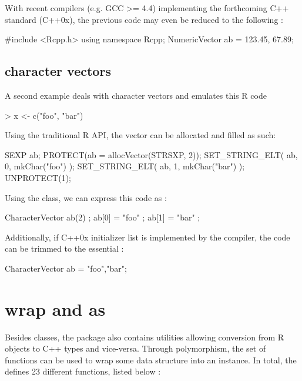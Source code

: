 With recent compilers (e.g. GCC >= 4.4) implementing the forthcoming 
C++ standard (C++0x), the previous code may even be reduced 
to the following :

\begin{example}
#include <Rcpp.h>
using namespace Rcpp;
NumericVector ab = {123.45, 67.89};
\end{example}

\subsection{character vectors}

A second example deals with character vectors and emulates this R code

\begin{example}
> x <- c("foo", "bar")
\end{example}

Using the traditional R API, the vector can be allocated and filled as such:

\begin{example}
SEXP ab;
PROTECT(ab = allocVector(STRSXP, 2));
SET_STRING_ELT( ab, 0, mkChar("foo") );
SET_STRING_ELT( ab, 1, mkChar("bar") );
UNPROTECT(1);
\end{example}

Using the  class, we can express this code as : 

\begin{example}
CharacterVector ab(2) ;
ab[0] = "foo" ;
ab[1] = "bar" ;
\end{example}

Additionally, if C++0x initializer list is implemented by the compiler, the 
code can be trimmed to the essential :

\begin{example}
CharacterVector ab = {"foo","bar"};
\end{example}


\section{wrap and as}

Besides classes, the  package also contains utilities allowing
conversion from R objects to C++ types and vice-versa. Through 
polymorphism, the  set of functions can be used to wrap 
some data structure into an  instance. In total, the 
 defines 23 different  functions, listed below :

